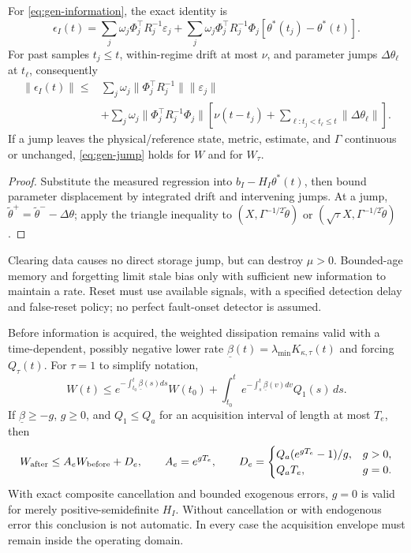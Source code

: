 \begin{proposition}
\label{prop:gen-regimes}
For \eqref{eq:gen-information}, the exact identity is
\begin{equation}
 \epsilon_I(t)=\sum_j\omega_j\Phi_j^\top R_j^{-1}\varepsilon_j+
 \sum_j\omega_j\Phi_j^\top R_j^{-1}\Phi_j
 [\theta^*(t_j)-\theta^*(t)].
 \label{eq:gen-stale-exact}
\end{equation}
For past samples $t_j\le t$, within-regime drift at most $\nu$, and
parameter jumps $\Delta\theta_\ell$ at $t_\ell$, consequently
\begin{align}
 \|\epsilon_I(t)\|\le{}&
 \sum_j\omega_j\|\Phi_j^\top R_j^{-1}\|\|\varepsilon_j\|\nonumber\\
 &+\sum_j\omega_j\|\Phi_j^\top R_j^{-1}\Phi_j\|
 \left[\nu(t-t_j)+\sum_{\ell:t_j<t_\ell\le t}\|\Delta\theta_\ell\|\right].
 \label{eq:gen-stale-bound}
\end{align}
If a jump leaves the physical/reference state, metric, estimate, and
$\Gamma$ continuous or unchanged, \eqref{eq:gen-jump} holds for $W$ and
for $W_\tau$.
\end{proposition}
\begin{proof}
Substitute the measured regression into $b_I-H_I\theta^*(t)$, then bound
parameter displacement by integrated drift and intervening jumps.
At a jump, $\tilde\theta^+=\tilde\theta^--\Delta\theta$; apply the
triangle inequality to $(X,\Gamma^{-1/2}\tilde\theta)$ or
$(\sqrt\tau X,\Gamma^{-1/2}\tilde\theta)$.
\end{proof}
Clearing data causes no direct storage jump, but can destroy $\mu>0$.
Bounded-age memory and forgetting limit stale bias only with sufficient
new information to maintain a rate. Reset must use available signals,
with a specified detection delay and false-reset policy; no perfect
fault-onset detector is assumed.

Before information is acquired, the weighted dissipation remains valid
with a time-dependent, possibly negative lower rate
$\underline\beta(t)=\lambda_{\min}K_{\kappa,\tau}(t)$ and forcing
$Q_\tau(t)$. For $\tau=1$ to simplify notation,
\begin{equation}
 W(t)\le e^{-\int_{t_0}^t\underline\beta(s)ds}W(t_0)+
 \int_{t_0}^t e^{-\int_s^t\underline\beta(v)dv}Q_1(s)\,ds.
 \label{eq:gen-signed-envelope}
\end{equation}
If $\underline\beta\ge-g$, $g\ge0$, and $Q_1\le Q_a$ for an
acquisition interval of length at most $T_e$, then
\begin{equation}
 W_{\rm after}\le A_eW_{\rm before}+D_e,\qquad A_e=e^{gT_e},\qquad
 D_e=\begin{cases}Q_a(e^{gT_e}-1)/g,&g>0,\\Q_aT_e,&g=0.\end{cases}
 \label{eq:gen-acquisition}
\end{equation}
With exact composite cancellation and bounded exogenous errors, $g=0$
is valid for merely positive-semidefinite $H_I$. Without cancellation or
with endogenous error this conclusion is not automatic. In every case
the acquisition envelope must remain inside the operating domain.

